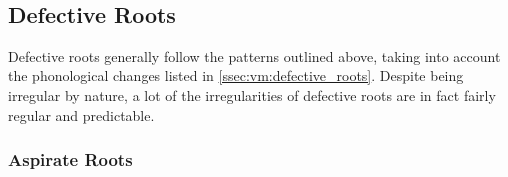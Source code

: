 \documentclass[grammar]{subfiles}
\begin{document}
\begin{table}[h!]\small\capstart
  \centering
  \\
  \caption{Pattern I geminate stems \label{tab:vm:i_geminate_stems}}
\end{table}


\subsection{Defective Roots}
\label{ssec:vm:i_defective}

Defective roots generally follow the patterns outlined above, taking into
account the phonological changes listed in \cref{ssec:vm:defective_roots}.
Despite being irregular by nature, a lot of the irregularities of defective
roots are in fact fairly regular and predictable. 


\subsubsection{Aspirate Roots}
\label{sssec:vm:i_aspirate}
\end{document}
